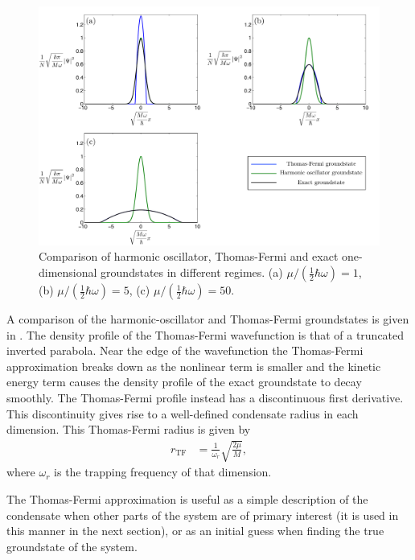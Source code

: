 \begin{figure}
    \centering
    \includegraphics[width=14cm]{GroundStateComparison}
    \caption{Comparison of harmonic oscillator, Thomas-Fermi and exact one-dimensional groundstates in different regimes.  (a) $\mu / (\frac{1}{2} \hbar \omega) = 1$, (b) $\mu / (\frac{1}{2} \hbar \omega) = 5$, (c) $\mu / (\frac{1}{2} \hbar \omega) = 50$.}
    \label{BackgroundTheory:GroundStateComparison}
\end{figure}

A comparison of the harmonic-oscillator and Thomas-Fermi groundstates is given in .  The density profile of the Thomas-Fermi wavefunction is that of a truncated inverted parabola.  Near the edge of the wavefunction the Thomas-Fermi approximation breaks down as the nonlinear term is smaller and the kinetic energy term causes the density profile of the exact groundstate to decay smoothly.  The Thomas-Fermi profile instead has a discontinuous first derivative.  This discontinuity gives rise to a well-defined condensate radius in each dimension.  This Thomas-Fermi radius is given by
\begin{align}
    r_\text{TF} &= \frac{1}{\omega_r} \sqrt{\frac{2 \mu}{M}},
\end{align}
where $\omega_r$ is the trapping frequency of that dimension.

The Thomas-Fermi approximation is useful as a simple description of the condensate when other parts of the system are of primary interest (it is used in this manner in the next section), or as an initial guess when finding the true groundstate of the system.

